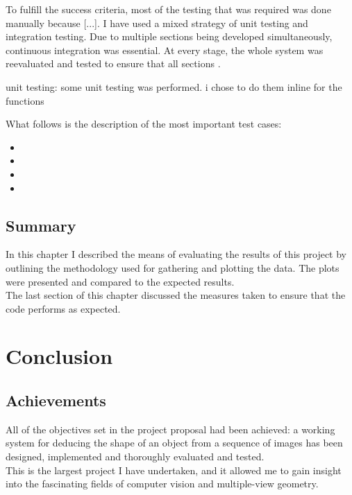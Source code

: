 \documentclass[12pt,a4paper,twoside,openright]{report}
\begin{document}
To fulfill the success criteria, most of the testing that was required was done manually because [...]. I have used a mixed strategy of unit testing and integration testing. Due to multiple sections being developed simultaneously, continuous integration was essential. At every stage, the whole system was reevaluated and tested to ensure that all sections . 

unit testing: some unit testing was performed. i chose to do them inline for the functions

What follows is the description of the most important test cases:
\begin{itemize}
\item
\item
\item
\item
\end{itemize}

\section{Summary}
In this chapter I described the means of evaluating the results of this project by outlining the methodology used for gathering and plotting the data. The plots were presented and compared to the expected results.\\ 
The last section of this chapter discussed the measures taken to ensure that the code performs as expected.

\chapter{Conclusion}


\section{Achievements}
All of the objectives set in the project proposal had been achieved: a working system for deducing the shape of an object from a sequence of images has been designed, implemented and thoroughly evaluated and tested.\\
\linebreak
This is the largest project I have undertaken, and it allowed me to gain insight into the fascinating fields of computer vision and multiple-view geometry. 
\end{document}
